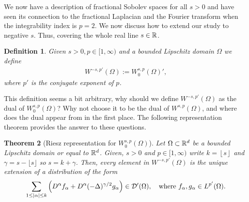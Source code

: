 \documentclass[12pt]{article}
\newtheorem{theorem}{Theorem}[section]
\newtheorem{definition}[theorem]{Definition}
\theoremstyle{definition}
\begin{document}
We now have a description of fractional Sobolev spaces for all $s>0$ and have seen its connection to the fractional Laplacian and the Fourier transform when the integrability index is $p=2$. We now discuss how to extend our study to negative $s$. Thus, covering the whole real line $s \in \mathbb{R}$.

\begin{definition}\label{dual definition}
	Given $s>0, p \in [1,\infty)$ and a bounded Lipschitz domain $\Omega $ we define
	\begin{align*}
		W^{-s,p'}(\Omega ):= W^{s,p}_0(\Omega )',
	\end{align*}
	where $p'$ is the conjugate exponent of $p$.
\end{definition}
This definition seems a bit arbitrary, why should we define $W^{-s,p'}(\Omega )$ as the dual of $W^{s,p}_0(\Omega )$? Why not choose it to be the dual of $W^{s,p}(\Omega )$, and where does the dual appear from in the first place. The following representation theorem provides the answer to these questions.
\begin{theorem}[Riesz representation for $W_0^{s,p}(\Omega )$]\label{riesz representation}
	Let $\Omega \subset \mathbb{R}^d$ be a bounded Lipschitz domain or equal to $\mathbb{R}^d$. Given,  $s>0$ and $p \in [1,\infty)$ write $k=\left\lfloor  s\right\rfloor$ and $\gamma = s- \lfloor s\rfloor$ so $s= k+\gamma $. Then,  every element in $W^{-s,p'}(\Omega )$ is the unique extension of a distribution  of the form
	\begin{align*}
		\sum_{1\leq\left| \alpha \right|\leq k}\left( D^\alpha f_\alpha+  D^\alpha (-\Delta )^{\gamma /2} g_\alpha\right)\in \mathcal{D}'(\Omega ),\quad \text{where }    f_\alpha, g_\alpha \in L^{p'}(\Omega ).
	\end{align*}

\end{theorem}
\end{document}
